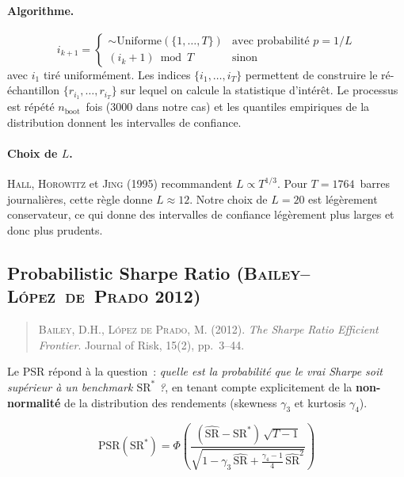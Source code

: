 \paragraph{Algorithme.}
\begin{equation}
i_{k+1} = \begin{cases}
\sim \text{Uniforme}(\{1, \ldots, T\}) & \text{avec probabilité } p = 1/L \\
(i_{k} + 1) \bmod T & \text{sinon}
\end{cases}
\label{eq:stationary_bootstrap_recurrence}
\end{equation}
avec $i_{1}$ tiré uniformément. Les indices $\{i_{1}, \ldots, i_{T}\}$ permettent de construire le ré-échantillon $\{r_{i_{1}}, \ldots, r_{i_{T}}\}$ sur lequel on calcule la statistique d'intérêt. Le processus est répété $n_{\text{boot}}$~fois (3000 dans notre cas) et les quantiles empiriques de la distribution donnent les intervalles de confiance.

\paragraph{Choix de $L$.} \textsc{Hall}, \textsc{Horowitz} et \textsc{Jing} (1995) recommandent $L \propto T^{1/3}$. Pour $T = 1764$~barres journalières, cette règle donne $L \approx 12$. Notre choix de $L = 20$ est légèrement conservateur, ce qui donne des intervalles de confiance légèrement plus larges et donc plus prudents.

\subsection{Probabilistic Sharpe Ratio (\textsc{Bailey--L\'opez~de~Prado} 2012)}
\label{app:psr}

\begin{quote}\small
\textsc{Bailey}, D.H., \textsc{L\'opez de Prado}, M. (2012). \emph{The Sharpe Ratio Efficient Frontier}. Journal of Risk, 15(2), pp.~3--44.
\end{quote}

Le PSR répond à la question~: \emph{quelle est la probabilité que le vrai Sharpe soit supérieur à un benchmark $\mathrm{SR}^{*}$ ?}, en tenant compte explicitement de la \textbf{non-normalité} de la distribution des rendements (skewness $\gamma_{3}$ et kurtosis $\gamma_{4}$).

\begin{equation}
\mathrm{PSR}(\mathrm{SR}^{*}) = \Phi\!\left(
\frac{(\widehat{\mathrm{SR}} - \mathrm{SR}^{*})\,\sqrt{T - 1}}
{\sqrt{1 - \gamma_{3}\,\widehat{\mathrm{SR}} + \frac{\gamma_{4} - 1}{4}\,\widehat{\mathrm{SR}}^{2}}}
\right)
\label{eq:psr}
\end{equation}

